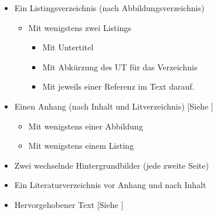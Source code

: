 \begin{itemize}
\begin{itemize}
\begin{itemize}
        \end{itemize}                                                                           
    \end{itemize}                                                                               
    \item Ein Listingsverzeichnis (nach Abbildungsverzeichnis)                                  
        \begin{itemize}                                                                         
            \item Mit wenigstens zwei Listings                                                  
                \begin{itemize}                                                                 
                    \item Mit Untertitel                                                        
                    \item Mit Abkürzung des UT für das Verzeichnis                              
                    \item Mit jeweils einer Referenz im Text darauf.                            
                \end{itemize}                                                                   
        \end{itemize}                                                                           
    \item Einen Anhang (nach Inhalt und Litverzeichnis)         [Siehe ]                              
        \begin{itemize}                                                                         
            \item Mit wenigstens einer Abbildung                                                
            \item Mit wenigstens einem Listing                                                             
        \end{itemize}                                                                           
    \item Zwei wechselnde Hintergrundbilder (jede zweite Seite)                                            
    \item Ein Literaturverzeichnis vor Anhang und nach Inhalt
    \item Hervorgehobener Text      [Siehe ]
        \begin{itemize}

\end{itemize}
\end{itemize}
